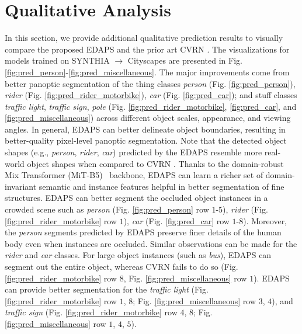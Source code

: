 \documentclass[10pt,twocolumn,letterpaper]{article}
\begin{document}
\section{Qualitative Analysis}
\label{sec:qualitative_analysis}

In this section, we provide additional qualitative prediction results to visually compare the proposed EDAPS and the prior art CVRN \cite{huang2021cross}. 
The visualizations for models trained on SYNTHIA $\rightarrow$ Cityscapes are presented in Fig. \ref{fig:pred_person}-\ref{fig:pred_miscellaneous}.
The major improvements come from better panoptic segmentation of the thing classes \emph{person} (Fig. \ref{fig:pred_person}), \emph{rider}  (Fig. \ref{fig:pred_rider_motorbike}), 
\emph{car} (Fig. \ref{fig:pred_car}); and stuff classes \emph{traffic light}, \emph{traffic sign}, \emph{pole} (Fig. \ref{fig:pred_rider_motorbike}, \ref{fig:pred_car}, and \ref{fig:pred_miscellaneous})
across different object scales, appearance, and viewing angles. 
In general, EDAPS can better delineate object boundaries, resulting in better-quality pixel-level panoptic segmentation.
Note that the detected object shapes (e.g., \emph{person}, \emph{rider}, \emph{car}) predicted by the EDAPS resemble more real-world object shapes when compared to CVRN \cite{huang2021cross}.
Thanks to the domain-robust Mix Transformer (MiT-B5)~\cite{xie2021segformer} backbone, 
EDAPS can learn a richer set of domain-invariant semantic and instance features helpful in better segmentation of fine structures.
EDAPS can better segment the occluded object instances in a crowded scene such as 
\emph{person} (Fig. \ref{fig:pred_person} row $1$-$5$), 
\emph{rider} (Fig. \ref{fig:pred_rider_motorbike} row $1$),
\emph{car} (Fig. \ref{fig:pred_car} row $1$-$8$).
Moreover, the \emph{person} segments predicted by EDAPS preserve finer details of the human body even when instances are occluded.
Similar observations can be made for the \emph{rider} and \emph{car} classes.
For large object instances (such as \emph{bus}), EDAPS can segment out the entire object, whereas CVRN fails to do so (Fig. \ref{fig:pred_rider_motorbike} row $8$, Fig. \ref{fig:pred_miscellaneous} row $1$).
EDAPS can provide better segmentation for the \emph{traffic light} 
(Fig. \ref{fig:pred_rider_motorbike}  row $1$, $8$; Fig. \ref{fig:pred_miscellaneous} row $3$, $4$), and 
\emph{traffic sign} 
(Fig. \ref{fig:pred_rider_motorbike}  row $4$, $8$; Fig. \ref{fig:pred_miscellaneous} row $1$, $4$, $5$).
\end{document}
